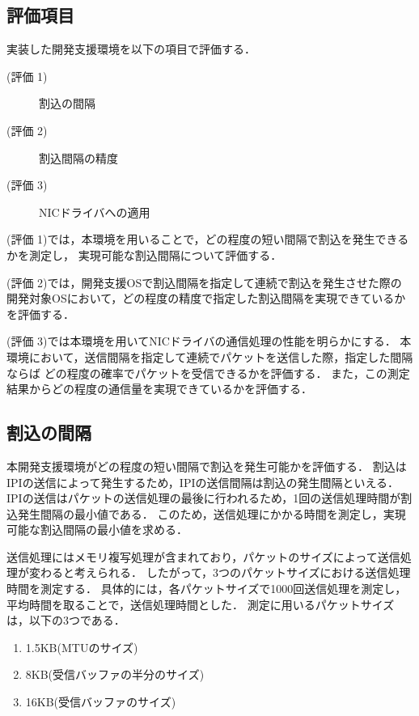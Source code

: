 \documentclass[submit,techreq,noauthor,dvipdfmx]{ipsj}
\begin{document}
\subsection{評価項目}\label{sec:item-of-evaluation}

実装した開発支援環境を以下の項目で評価する．
\begin{description}
    \item[(評価 1)]割込の間隔
    \item[(評価 2)]割込間隔の精度
    \item[(評価 3)]NICドライバへの適用
\end{description}

(評価 1)では，本環境を用いることで，どの程度の短い間隔で割込を発生できるかを測定し，
実現可能な割込間隔について評価する．

(評価 2)では，開発支援OSで割込間隔を指定して連続で割込を発生させた際の
開発対象OSにおいて，どの程度の精度で指定した割込間隔を実現できているかを評価する．

(評価 3)では本環境を用いてNICドライバの通信処理の性能を明らかにする．
本環境において，送信間隔を指定して連続でパケットを送信した際，指定した間隔ならば
どの程度の確率でパケットを受信できるかを評価する．
また，この測定結果からどの程度の通信量を実現できているかを評価する．

\subsection{割込の間隔}\label{sec:interval}

本開発支援環境がどの程度の短い間隔で割込を発生可能かを評価する．
割込はIPIの送信によって発生するため，IPIの送信間隔は割込の発生間隔といえる．
IPIの送信はパケットの送信処理の最後に行われるため，1回の送信処理時間が割込発生間隔の最小値である．
このため，送信処理にかかる時間を測定し，実現可能な割込間隔の最小値を求める．

送信処理にはメモリ複写処理が含まれており，パケットのサイズによって送信処理が変わると考えられる．
したがって，3つのパケットサイズにおける送信処理時間を測定する．
具体的には，各パケットサイズで1000回送信処理を測定し，
平均時間を取ることで，送信処理時間とした．
測定に用いるパケットサイズは，以下の3つである．
\begin{enumerate}
    \item 1.5KB(MTUのサイズ)
    \item 8KB(受信バッファの半分のサイズ)
    \item 16KB(受信バッファのサイズ)
\end{enumerate}
\end{document}
